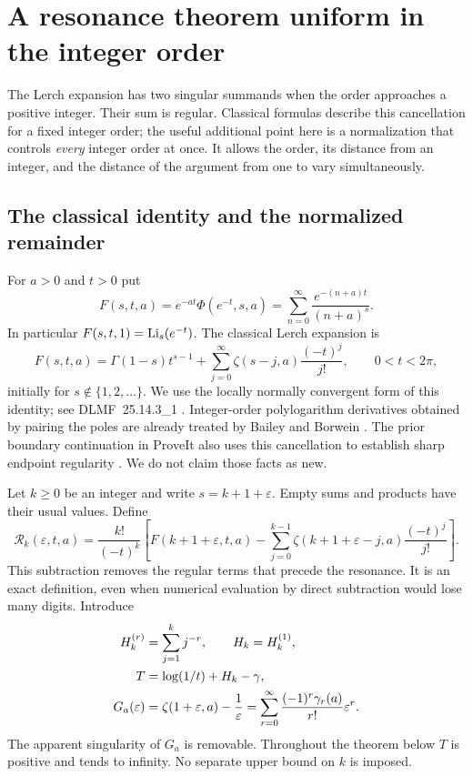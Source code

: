 \section{A resonance theorem uniform in the integer order}
\label{sec:resonance}

The Lerch expansion has two singular summands when the order approaches a
positive integer. Their sum is regular. Classical formulas describe this
cancellation for a fixed integer order; the useful additional point here is a
normalization that controls \emph{every} integer order at once. It allows the
order, its distance from an integer, and the distance of the argument from
one to vary simultaneously.

\subsection{The classical identity and the normalized remainder}
For $a>0$ and $t>0$ put
\begin{equation}\label{res:F}
 F(s,t,a)=e^{-at}\Phi(e^{-t},s,a)
 =\sum_{n=0}^{\infty}\frac{e^{-(n+a)t}}{(n+a)^s}.
\end{equation}
In particular $F(s,t,1)=\operatorname{Li}_s(e^{-t})$. The classical Lerch expansion is
\begin{equation}\label{res:classical}
 F(s,t,a)=\Gamma(1-s)t^{s-1}
       +\sum_{j=0}^{\infty}\zeta(s-j,a)\frac{(-t)^j}{j!},
 \qquad 0<t<2\pi,
\end{equation}
initially for $s\notin\{1,2,\ldots\}$. We use the locally normally convergent
form of this identity; see DLMF~25.14.3\_1 \cite{dlmflerch}. Integer-order
polylogarithm derivatives obtained by pairing the poles are already treated
by Bailey and Borwein \cite{baileyborwein}. The prior boundary continuation
in ProveIt also uses this cancellation to establish sharp endpoint regularity
\cite{repoBoundary}. We do not claim those facts as new.

Let $k\geq0$ be an integer and write $s=k+1+\varepsilon$. Empty sums and
products have their usual values. Define
\begin{equation}\label{res:normalized}
 \mathcal R_k(\varepsilon,t,a)=
 \frac{k!}{(-t)^k}\left[
 F(k+1+\varepsilon,t,a)
 -\sum_{j=0}^{k-1}\zeta(k+1+\varepsilon-j,a)\frac{(-t)^j}{j!}
 \right].
\end{equation}
This subtraction removes the regular terms that precede the resonance. It
is an exact definition, even when numerical evaluation by direct subtraction
would lose many digits. Introduce
\begin{align}
 H_k^{(r)}&=\sum_{j=1}^k j^{-r},\qquad H_k=H_k^{(1)},\notag\\
 T&=\log(1/t)+H_k-\gamma,\label{res:T}\\
 G_a(\varepsilon)&=\zeta(1+\varepsilon,a)-\frac1\varepsilon
  =\sum_{r=0}^{\infty}\frac{(-1)^r\gamma_r(a)}{r!}\varepsilon^r.
 \label{res:G}
\end{align}
The apparent singularity of $G_a$ is removable. Throughout the theorem below
$T$ is positive and tends to infinity. No separate upper bound on $k$ is
imposed.

